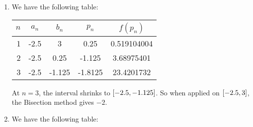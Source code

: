 \documentclass[../../Assignments.tex]{subfiles}
\begin{document}
\begin{solution}
\begin{enumerate}[label = (\alph*)]
        \item We have the following table:


            \begin{table}[H]
                \centering
                \begin{tabular}{r S[table-format=-1.1] S[table-format=-1.3] S[table-format=-1.4] S[table-format=2.9]}
                    \toprule
                    \(n\)  &   {\(a_n\)}   &   {\(b_n\)}   &   {\(p_n\)}   &  {\(f(p_n)\)}  \\
                      &  -2.5         &   3           &   0.25        &    0.519104004 \\
                        2  &  -2.5         &   0.25        &  -1.125       &    3.68975401  \\
                        3  &  -2.5         &  -1.125       &  -1.8125      &   23.4201732   \\
                    \bottomrule
                \end{tabular}
            \end{table}

            At \(n = 3\), the interval shrinks to
            \(\interval{\num{-2.5}}{\num{-1.125}}\). So when applied on
            \(\interval{\num{-2.5}}{3}\), the Bisection method gives \(-2\).

        \item We have the following table:


\end{enumerate}
\end{solution}
\end{document}
